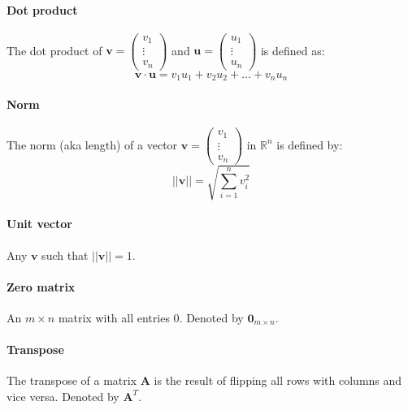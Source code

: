 \documentclass{scrartcl}
\newcommand{\R}{\mathbb{R}}
\renewcommand{\vec}[1]{\mathbf{#1}}
\begin{document}
\paragraph{Dot product}
The dot product of $ \vec{v} = \begin{pmatrix}
v_{1} \\ \vdots \\ v_{n}
\end{pmatrix} $ and $ \vec{u} = \begin{pmatrix}
u_{1} \\ \vdots \\ u_{n}
\end{pmatrix} $ is defined as:
\begin{equation}
\vec{v} \cdot \vec{u} = v_{1} u_{1} + v_{2} u_{2} + ... + v_{n} u_{n}
\end{equation}

\paragraph{Norm}
The norm (aka length) of a vector $ \vec{v} = \begin{pmatrix}
v_{1} \\ \vdots \\ v_{n}
\end{pmatrix} $ in $ \R^{n} $ is defined by:
\begin{equation}
||\vec{v}|| = \sqrt{\sum_{i=1}^{n} v_{i}^{2}}
\end{equation}

\paragraph{Unit vector}
Any $ \vec{v} $ such that $ ||\vec{v}|| = 1 $.

\paragraph{Zero matrix}
An $ m \times n $ matrix with all entries 0. Denoted by $ \vec{0}_{m \times n} $.

\paragraph{Transpose}
The transpose of a matrix $ \vec{A} $ is the result of flipping all rows with columns and vice versa. Denoted by $ \vec{A}^{T} $.
\end{document}
